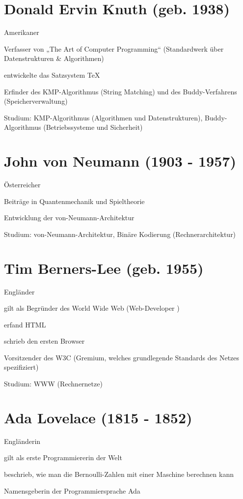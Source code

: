 \documentclass[a4paper,12pt]{report}
\begin{document}
\section*{Donald Ervin Knuth (geb. 1938)}
\begin{itemize*}
	\item Amerikaner
	\item Verfasser von „The Art of Computer Programming“ (Standardwerk über Datenstrukturen \&
		  Algorithmen)
	\item entwickelte das Satzsystem TeX
	\item Erfinder des KMP-Algorithmus (String Matching) und des Buddy-Verfahrens
	      (Speicherverwaltung)
	\item Studium: KMP-Algorithmus (Algorithmen und Datenstrukturen), Buddy-Algorithmus
		  (Betriebssysteme und Sicherheit)
\end{itemize*}

\section*{John von Neumann (1903 - 1957)}
\begin{itemize*}
	\item Österreicher
	\item Beiträge in Quantenmechanik und Spieltheorie
	\item Entwicklung der von-Neumann-Architektur
	\item Studium: von-Neumann-Architektur, Binäre Kodierung (Rechnerarchitektur)
\end{itemize*}

\section*{Tim Berners-Lee (geb. 1955)}
\begin{itemize*}
	\item Engländer
	\item gilt als Begründer des World Wide Web (Web-Developer \Laughey)
	\item erfand HTML
	\item schrieb den ersten Browser
	\item Vorsitzender des W3C (Gremium, welches grundlegende Standards des Netzes
	      spezifiziert)
	\item Studium: WWW (Rechnernetze)
\end{itemize*}

\newpage

\section*{Ada Lovelace (1815 - 1852)}
\begin{itemize*}
	\item Engländerin
	\item gilt als erste Programmiererin der Welt
	\item beschrieb, wie man die Bernoulli-Zahlen mit einer Maschine berechnen kann
	\item Namensgeberin der Programmiersprache Ada
\end{itemize*}
\end{document}
